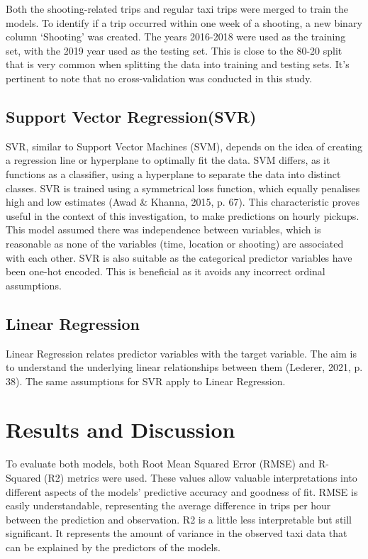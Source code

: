 \documentclass[11pt]{article}
\begin{document}
Both the shooting-related trips and regular taxi trips were merged to train the models. To identify if a trip occurred within one week of a shooting, a new binary column ‘Shooting’ was created. The years 2016-2018 were used as the training set, with the 2019 year used as the testing set. This is close to the 80-20 split that is very common when splitting the data into training and testing sets. It's pertinent to note that no cross-validation was conducted in this study.

\subsection{Support Vector Regression(SVR)}
\hspace{0pt}SVR, similar to Support Vector Machines (SVM), depends on the idea of creating a regression line or hyperplane to optimally fit the data. SVM differs, as it functions as a classifier, using a hyperplane to separate the data into distinct classes. SVR is trained using a symmetrical loss function, which equally penalises high and low estimates (Awad \& Khanna, 2015, p. 67). This characteristic proves useful in the context of this investigation, to make predictions on hourly pickups. This model assumed there was independence between variables, which is reasonable as none of the variables (time, location or shooting) are associated with each other. SVR is also suitable as the categorical predictor variables have been one-hot encoded. This is beneficial as it avoids any incorrect ordinal assumptions. 

\subsection{Linear Regression}
\hspace{0pt}Linear Regression relates predictor variables with the target variable. The aim is to understand the underlying linear relationships between them (Lederer, 2021, p. 38). The same assumptions for SVR apply to Linear Regression. 

\section{Results and Discussion}
\hspace{0pt}To evaluate both models, both Root Mean Squared Error (RMSE) and R-Squared (R2) metrics were used. These values allow valuable interpretations into different aspects of the models’ predictive accuracy and goodness of fit. RMSE is easily understandable, representing the average difference in trips per hour between the prediction and observation. R2 is a little less interpretable but still significant. It represents the amount of variance in the observed taxi data that can be explained by the predictors of the models.
\end{document}
